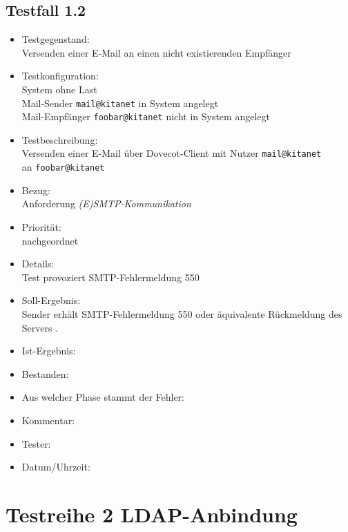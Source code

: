 \subsection{Testfall 1.2}
\begin{itemize}
	\item Testgegenstand:\\
	Versenden einer E-Mail an einen nicht existierenden Empfänger
	\item Testkonfiguration:\\
	System ohne Last\\
	Mail-Sender \verb+mail@kitanet+ in System angelegt\\
	Mail-Empfänger \verb+foobar@kitanet+ nicht in System angelegt
	\item Testbeschreibung:\\
	Versenden einer E-Mail über Dovecot-Client mit Nutzer \verb+mail@kitanet+ \\ an \verb+foobar@kitanet+
	\item Bezug:\\
	Anforderung \textit{(E)SMTP-Kommunikation}
	\item Priorität:\\
	nachgeordnet
	\item Details:\\
	Test provoziert SMTP-Fehlermeldung 550
	\item Soll-Ergebnis:\\
	Sender erhält SMTP-Fehlermeldung 550 oder äquivalente Rückmeldung des Servers \citep[vgl.][16]{rfc821}.
	\item Ist-Ergebnis:\\
	\item Bestanden:\\
	\item Aus welcher Phase stammt der Fehler:\\
	\item Kommentar:\\
	\item Tester:\\
	\item Datum/Uhrzeit:\\
\end{itemize}

\section{Testreihe 2 LDAP-Anbindung}
